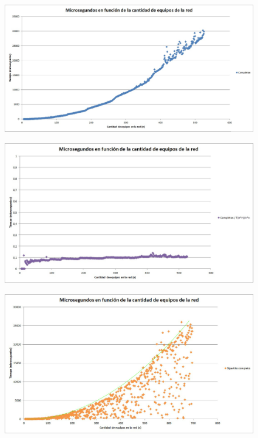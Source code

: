 \begin{figure}[H]
                \includegraphics[scale=0.6]{ej3/comple}
                \caption{}
                \label{fig:exp2}
\end{figure} 



\begin{figure}[H]
                \includegraphics[scale=0.6]{ej3/compleConst}
                \caption{}
                \label{fig:exp2}
\end{figure}


\begin{figure}[H]
                \includegraphics[scale=0.4]{ej3/bPartCom}
                \caption{}
                \label{fig:exp2}
\end{figure} 



